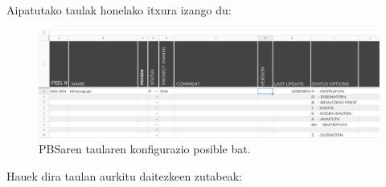\documentclass[10pt,a4paper]{article}
\begin{document}
\newpage

Aipatutako taulak honelako itxura izango du:

\begin{figure}[h]
\centering
\includegraphics[width=\linewidth]{1}
\caption{PBSaren taularen konfigurazio posible bat.}
\end{figure}

Hauek dira taulan aurkitu daitezkeen zutabeak:
\end{document}
